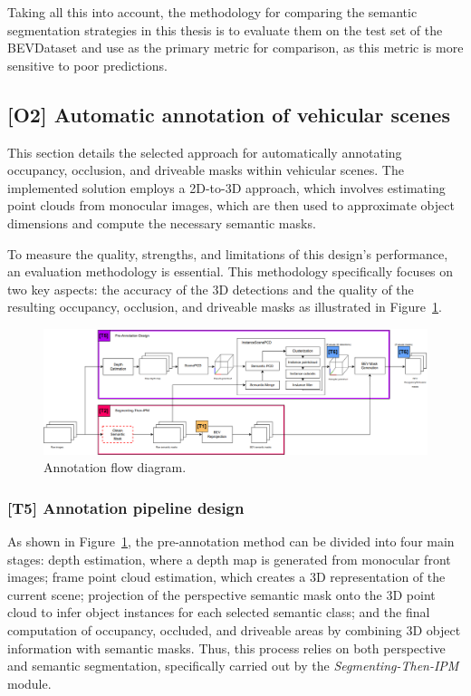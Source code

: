 Taking all this into account, the methodology for comparing the  semantic segmentation strategies in this thesis is to evaluate them on the test set of the BEVDataset and use  as the primary metric for comparison, as this metric is more sensitive to poor predictions.


\subsection{[O2] Automatic annotation of vehicular scenes} \label{sec:aplication}
This section details the selected approach for automatically annotating occupancy, occlusion, and driveable masks within vehicular scenes. The implemented solution employs a 2D-to-3D approach, which involves estimating point clouds from monocular images, which are then used to approximate object dimensions and compute the necessary semantic masks.

To measure the quality, strengths, and limitations of this design's performance, an evaluation methodology is essential. This methodology specifically focuses on two key aspects: the accuracy of the 3D detections and the quality of the resulting occupancy, occlusion, and driveable masks as illustrated in Figure~\ref{fig:application_flow_diagram}.

\begin{figure}[h!]
    \centering
    \includegraphics[width=\linewidth]{images/methodology/Application_flow_diagram.png}
    \caption{Annotation flow diagram.}
    \label{fig:application_flow_diagram}
\end{figure}

\subsubsection{[T5] Annotation pipeline design}
As shown in Figure~\ref{fig:application_flow_diagram}, the pre-annotation method can be divided into four main stages: depth estimation, where a depth map is generated from monocular front images; frame point cloud estimation, which creates a 3D representation of the current scene; projection of the perspective semantic mask onto the 3D point cloud to infer object instances for each selected semantic class; and the final computation of occupancy, occluded, and driveable areas by combining 3D object information with  semantic masks.  Thus, this process relies on both perspective and  semantic segmentation, specifically carried out by the \textit{Segmenting-Then-IPM} module.


